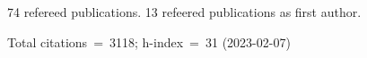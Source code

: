 74 refereed publications. 13 refeered publications as first author.

Total citations~=~3118; h-index~=~31 (2023-02-07)